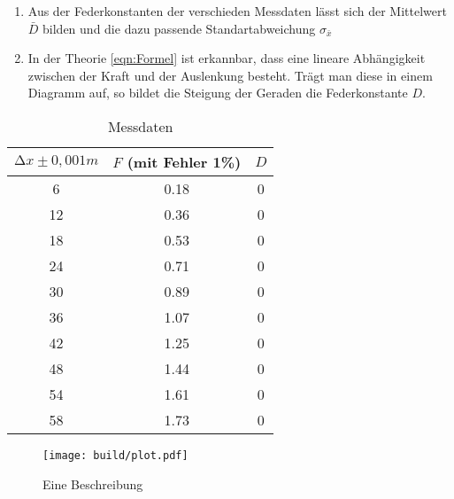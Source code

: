 \documentclass[titlepage = firstcover]{scrartcl}
\begin{document}
\begin{enumerate}
  \item Aus der Federkonstanten der verschieden Messdaten lässt sich der Mittelwert $\bar{D}$ bilden und die dazu passende 
  Standartabweichung $\sigma_{\bar{x}}$

  \item In der Theorie \eqref{eqn:Formel} ist erkannbar, dass eine lineare Abhängigkeit zwischen der Kraft und der Auslenkung besteht.
  Trägt man diese in einem Diagramm auf, so bildet die Steigung der Geraden die Federkonstante $D$.
\end{enumerate}



\begin{table}[h]
  \centering
  \caption{Messdaten}
  \label{tab:table}
  \begin{tabular}{c c c}
    \toprule
  $ \increment x \pm 0,001m $ & $F$ (mit Fehler 1\%)  & $D$  \\
    \midrule
  6  &	0.18 & 0 \\	
  12 &	0.36 & 0	\\
  18 &	0.53 & 0	\\
  24 &	0.71 & 0	\\
  30 &	0.89 & 0 \\
  36 &	1.07 & 0 \\
  42 & 	1.25 & 0 \\
  48 &	1.44 & 0 \\
  54 &	1.61 & 0 \\
  58 &	1.73 & 0 \\
  \bottomrule
\end{tabular}
\end{table}


\begin{figure}
  \centering
  \texttt{[image: build/plot.pdf]}
  \caption{Eine Beschreibung}
  \label{fig:Plot}
\end{figure}
\end{document}
